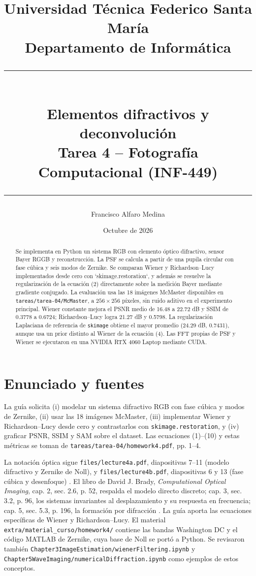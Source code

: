 \documentclass[11pt,a4paper]{article}
\title{\large Universidad T\'ecnica Federico Santa Mar\'ia\\Departamento de Inform\'atica\\[0.5em]
\rule{\linewidth}{0.5pt}\\[0.4em]\LARGE\textbf{Elementos difractivos y deconvoluci\'on}\\
\large Tarea 4 -- Fotograf\'ia Computacional (INF-449)\\[-0.2em]\rule{\linewidth}{1.2pt}}
\author{Francisco Alfaro Medina}
\date{Octubre de 2026}
\begin{document}
\maketitle

\begin{abstract}
Se implementa en Python un sistema RGB con elemento \'optico difractivo, sensor Bayer RGGB y reconstrucci\'on. La PSF se calcula a partir de una pupila circular con fase c\'ubica y seis modos de Zernike. Se comparan Wiener y Richardson--Lucy implementados desde cero con `skimage.restoration`, y adem\'as se resuelve la regularizaci\'on de la ecuaci\'on (2) directamente sobre la medici\'on Bayer mediante gradiente conjugado. La evaluaci\'on usa las 18 im\'agenes McMaster disponibles en \texttt{tareas/tarea-04/McMaster}, a $256\times256$ p\'ixeles, sin ruido aditivo en el experimento principal. Wiener constante mejora el PSNR medio de 16.48 a 22.72 dB y SSIM de 0.3778 a 0.6724; Richardson--Lucy logra 21.27 dB y 0.5798. La regularizaci\'on Laplaciana de referencia de \texttt{skimage} obtiene el mayor promedio (24.29 dB, 0.7431), aunque usa un prior distinto al Wiener de la ecuaci\'on (4). Las FFT propias de PSF y Wiener se ejecutaron en una NVIDIA RTX 4060 Laptop mediante CUDA.
\end{abstract}

\section{Enunciado y fuentes}
La gu\'ia solicita (i) modelar un sistema difractivo RGB con fase c\'ubica y modos de Zernike, (ii) usar las 18 im\'agenes McMaster, (iii) implementar Wiener y Richardson--Lucy desde cero y contrastarlos con \texttt{skimage.restoration}, y (iv) graficar PSNR, SSIM y SAM sobre el dataset. Las ecuaciones (1)--(10) y estas m\'etricas se toman de \texttt{tareas/tarea-04/homework4.pdf}, pp. 1--4.

La notaci\'on \'optica sigue \texttt{files/lecture4a.pdf}, diapositivas 7--11 (modelo difractivo y Zernike de Noll), y \texttt{files/lecture4b.pdf}, diapositivas 6 y 13 (fase c\'ubica y desenfoque) \cite{lecture4a,lecture4b}. El libro de David J. Brady, \emph{Computational Optical Imaging}, cap. 2, sec. 2.6, p. 52, respalda el modelo directo discreto; cap. 3, sec. 3.2, p. 96, los sistemas invariantes al desplazamiento y su respuesta en frecuencia; cap. 5, sec. 5.3, p. 196, la formaci\'on por difracci\'on \cite{brady}. La gu\'ia aporta las ecuaciones espec\'ificas de Wiener y Richardson--Lucy. El material \texttt{extra/material\_curso/homework4/} contiene las bandas Washington DC y el c\'odigo MATLAB de Zernike, cuya base de Noll se port\'o a Python. Se revisaron tambi\'en \texttt{Chapter3ImageEstimation/wienerFiltering.ipynb} y \texttt{Chapter5WaveImaging/numericalDiffraction.ipynb} como ejemplos de estos conceptos.
\end{document}
